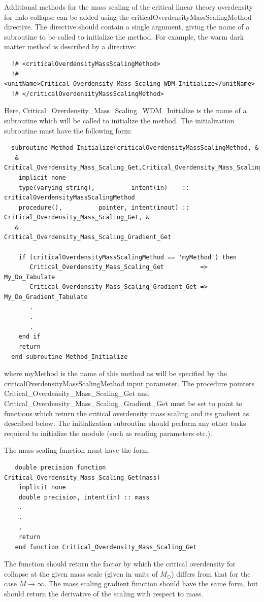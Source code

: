 Additional methods for the mass scaling of the critical linear theory overdensity for halo collapse can be added using the {\normalfont \ttfamily criticalOverdensityMassScalingMethod} directive. The directive should contain a single argument, giving the name of a subroutine to be called to initialize the method. For example, the {\normalfont \ttfamily warm dark matter} method is described by a directive:
\begin{verbatim}
  !# <criticalOverdensityMassScalingMethod>
  !#  <unitName>Critical_Overdensity_Mass_Scaling_WDM_Initialize</unitName>
  !# </criticalOverdensityMassScalingMethod>
\end{verbatim}
Here, {\normalfont \ttfamily Critical\_Overdensity\_Mass\_Scaling\_WDM\_Initialize} is the name of a subroutine which will be called to initialize the method. The initialization subroutine must have the following form:
\begin{verbatim}
  subroutine Method_Initialize(criticalOverdensityMassScalingMethod, &
   & Critical_Overdensity_Mass_Scaling_Get,Critical_Overdensity_Mass_Scaling_Gradient_Get)
    implicit none
    type(varying_string),          intent(in)    :: criticalOverdensityMassScalingMethod
    procedure(),          pointer, intent(inout) :: Critical_Overdensity_Mass_Scaling_Get, &
   &                                                Critical_Overdensity_Mass_Scaling_Gradient_Get
    
    if (criticalOverdensityMassScalingMethod == 'myMethod') then
       Critical_Overdensity_Mass_Scaling_Get          => My_Do_Tabulate
       Critical_Overdensity_Mass_Scaling_Gradient_Get => My_Do_Gradient_Tabulate
       .
       .
       .
    end if
    return
  end subroutine Method_Initialize
\end{verbatim}
where {\normalfont \ttfamily myMethod} is the name of this method as will be specified by the {\normalfont \ttfamily criticalOverdensityMassScalingMethod} input parameter. The procedure pointers {\normalfont \ttfamily Critical\_Overdensity\_Mass\_Scaling\_Get} and {\normalfont \ttfamily Critical\_Overdensity\_Mass\_Scaling\_Gradient\_Get} must be set to point to functions which return the critical overdensity mass scaling and its gradient as described below. The initialization subroutine should perform any other tasks required to initialize the module (such as reading parameters etc.).

The mass scaling function must have the form:
\begin{verbatim}
   double precision function Critical_Overdensity_Mass_Scaling_Get(mass)
    implicit none
    double precision, intent(in) :: mass
    .
    .
    .
    return
   end function Critical_Overdensity_Mass_Scaling_Get
\end{verbatim}
The function should return the factor by which the critical overdensity for collapse at the given {\normalfont \ttfamily mass} scale (given in units of $M_{\odot}$) differs from that for the case $M\rightarrow\infty$. The mass scaling gradient function should have the same form, but should return the derivative of the scaling with respect to mass.


